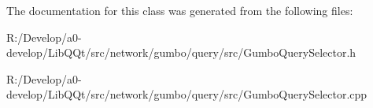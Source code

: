 The documentation for this class was generated from the following files\+:\begin{DoxyCompactItemize}
\item 
R\+:/\+Develop/a0-\/develop/\+Lib\+Q\+Qt/src/network/gumbo/query/src/Gumbo\+Query\+Selector.\+h\item 
R\+:/\+Develop/a0-\/develop/\+Lib\+Q\+Qt/src/network/gumbo/query/src/Gumbo\+Query\+Selector.\+cpp\end{DoxyCompactItemize}
